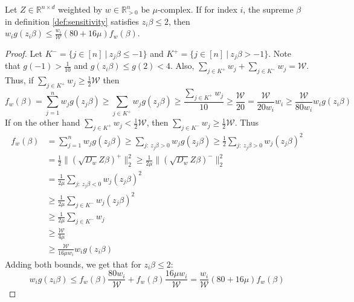 \begin{lemma}
    Let $Z \in \mathbb{R}^{n \times d}$ weighted by $w \in \mathbb{R}^n_{>0}$
    be $\mu$-complex. If for index $i$, the supreme $\beta$ in definition \ref{def:sensitivity} satisfies
    $z_i \beta \leq 2$, then
    $w_i g(z_i \beta) \leq \frac{w_i}{\mathcal{W}} (80 + 16 \mu) f_w(\beta)$.
\end{lemma}
\begin{proof}
    Let $K^- = \{ j \in [n] \ | \ z_j \beta \leq -1 \}$ and
    $K^+ = \{ j \in [n] \ | \ z_j \beta > -1 \}$.
    Note that $g(-1) > \frac{1}{10}$ and
    $g(z_i \beta) \leq g(2) < 4$.
    Also, $\sum_{j \in K^+} w_j + \sum_{j \in K^-} w_j = \mathcal{W}$.
    \\
    Thus, if $\sum_{j \in K^+} w_j \geq \frac{1}{2} \mathcal{W}$ then
    $$
        f_w(\beta) = \sum_{j=1}^n w_j g(z_j \beta)
        \geq \sum_{j \in K^+} w_j g(z_j \beta)
        \geq \frac{\sum_{j \in K^+} w_j}{10}
        \geq \frac{\mathcal{W}}{20}
        = \frac{\mathcal{W}}{20 w_i} w_i
        \geq \frac{\mathcal{W}}{80 w_i} w_i g(z_i \beta)
    $$
    If on the other hand $\sum_{j \in K^+} w_j < \frac{1}{2} \mathcal{W}$,
    then $\sum_{j \in K^-} w_j \geq \frac{1}{2} \mathcal{W}$. Thus
    \begin{align*}
        f_w(\beta)
         & = \sum_{j=1}^n w_j g(z_j \beta)
        \geq \sum_{j: \  z_j \beta > 0} w_j g(z_j \beta)
        \geq \frac{1}{2} \sum_{j: \  z_j \beta > 0} w_j (z_j \beta)^2    \\
         & = \frac{1}{2} \lVert (\sqrt{D_w} Z \beta)^+ \rVert_2^2
        \geq \frac{1}{2 \mu} \lVert (\sqrt{D_w} Z \beta)^- \rVert_2^2    \\
         & = \frac{1}{2 \mu} \sum_{j: \ z_j \beta < 0} w_j (z_j \beta)^2 \\
         & \geq \frac{1}{2 \mu} \sum_{j \in K^-} w_j (z_j \beta)^2       \\
         & \geq \frac{1}{2 \mu} \sum_{j \in K^-} w_j                     \\
         & \geq \frac{\mathcal{W}}{4 \mu}                                \\
         & \geq \frac{\mathcal{W}}{16 \mu w_i} w_i g(z_i \beta)
    \end{align*}
    Adding both bounds, we get that for $z_i \beta \leq 2$:
    $$
        w_i g(z_i \beta) \leq f_w(\beta) \frac{80 w_i}{\mathcal{W}}
        + f_w(\beta) \frac{16 \mu w_i}{\mathcal{W}}
        = \frac{w_i}{\mathcal{W}} (80 + 16 \mu) f_w(\beta)
    $$
\end{proof}

